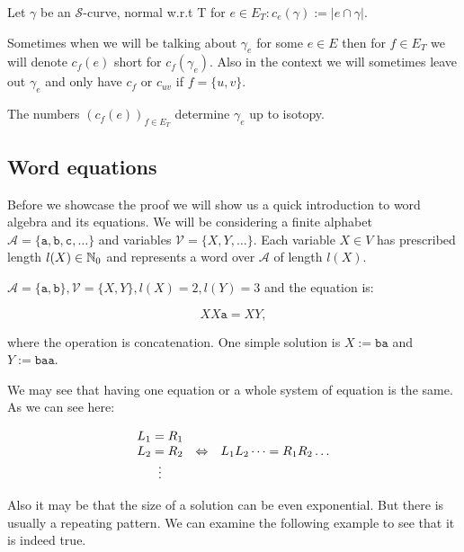 \begin{defn}
	Let $\gamma$ be an $\mathcal{S}$-curve, normal w.r.t T for $e \in E_T: c_e(\gamma) := |e \cap \gamma|$.
\end{defn}

Sometimes when we will be talking about $\gamma_e$ for some $e \in E$ then for $f \in E_T$ we will denote $c_f(e)$ short for $c_f(\gamma_e)$. Also in the context we will sometimes leave out $\gamma_e$ and only have $c_f$ or $c_{uv}$ if $f = \{u,v\}$.

\begin{claim}
	The numbers $\left( c_f(e)\right)_{f \in E_T}$ determine $\gamma_e$ up to isotopy.
	\label{string-claim}
\end{claim}

\subsection{Word equations}

Before we showcase the proof we will show us a quick introduction to word algebra and its equations. We will be considering a finite alphabet $\mathcal{A} = \{\mathtt{a}, \mathtt{b}, \mathtt{c}, \dots\}$ and variables $\mathcal{V} = \{X,Y, \dots\}$. Each variable $X \in V$ has prescribed length $l(X) \in \mathbb{N}_0$ and represents a word over $\mathcal{A}$ of length $l(X)$.

\begin{example}
	$\mathcal{A} = \{\mathtt{a}, \mathtt{b}\}, \mathcal{V} = \{X,Y\}, l(X) = 2, l(Y) = 3$ and the equation is:
	
	$$
	XX\mathtt{a} = XY,
	$$
	
	\noindent where the operation is concatenation. One simple solution is $X := \mathtt{ba}$ and $Y := \mathtt{baa}$.
\end{example}

We may see that having one equation or a whole system of equation is the same. As we can see here:

$$
\begin{array}{c c c}
	L_1 = R_1 & & \\
	L_2 = R_2 & \Leftrightarrow & L_1L_2 \dots = R_1 R_2 \dots \\
	\vdots & &
\end{array}
$$

Also it may be that the size of a solution can be even exponential. But there is usually a repeating pattern. We can examine the following example to see that it is indeed true.

